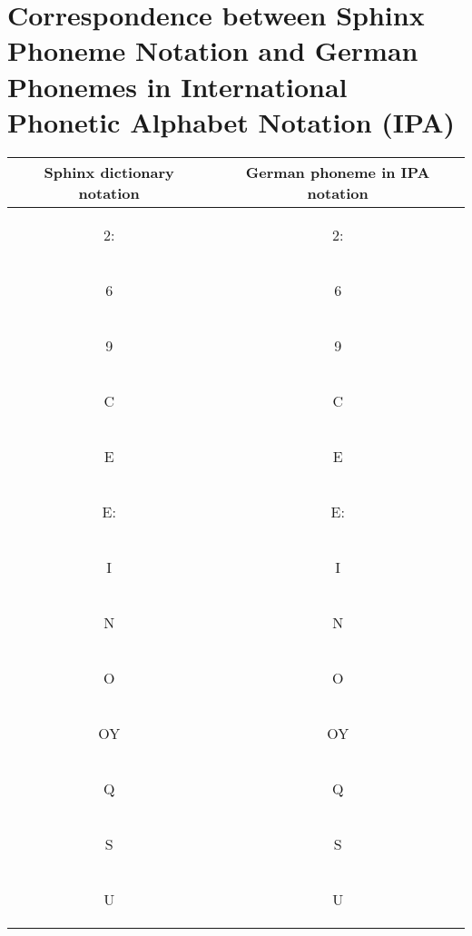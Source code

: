 \chapter{Correspondence between Sphinx Phoneme Notation and German Phonemes in
International Phonetic Alphabet Notation (IPA) }
\label{chap:appA}
\begin {longtable}{ c | c }
     \toprule
    Sphinx dictionary notation & German phoneme in IPA notation \\  \toprule
    2:  & \begin{IPA} 2:\end{IPA} \\ 
    6 &  \begin{IPA} 6\end{IPA}\\ 
    9  & \begin{IPA} 9\end{IPA} \\ 
    C  &  \begin{IPA} C \end{IPA}\\ 
    E  & \begin{IPA} E\end{IPA}\\ 
    E:  & \begin{IPA} E:\end{IPA}\\ 
    I  & \begin{IPA} I\end{IPA}\\ 
    N  &\begin{IPA} N \end{IPA} \\  
    O  & \begin{IPA} O \end{IPA}\\  
    OY  & \begin{IPA}OY\end{IPA}\\  
    Q  & \begin{IPA} Q\end{IPA}\\ 
    S  & \begin{IPA} S\end{IPA}\\ 
    U  & \begin{IPA} U\end{IPA}\\  

\end{longtable}
